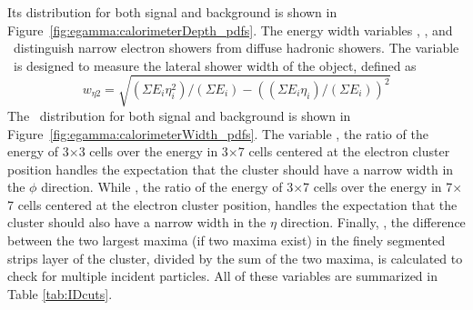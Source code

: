 Its distribution for both signal and background is shown in Figure~\ref{fig:egamma:calorimeterDepth_pdfs}.
The energy width variables \weta, \rphi, and \reta\ distinguish narrow electron showers from diffuse hadronic showers.
The variable \weta\ is designed to measure the lateral shower width of the object, defined as \begin{equation*}
    w_{\eta 2} = \sqrt{(\Sigma E_i \eta_i^2)/(\Sigma E_i) -((\Sigma E_i\eta_i)/(\Sigma E_i))^2}
\end{equation*}
The \weta\ distribution for both signal and background is shown in Figure~\ref{fig:egamma:calorimeterWidth_pdfs}.
The variable \Rphi, the ratio of the energy of 3$\times$3 cells over the energy in 3$\times$7 cells centered at the electron cluster position handles the expectation that the cluster should have a narrow width in the $\phi$ direction.
While \reta, the ratio of the energy of 3$\times$7 cells over the energy in 7$\times$7 cells centered at the electron cluster position, handles the expectation that the cluster should also have a narrow width in the $\eta$ direction.
Finally, \deltaEmax, the difference between the two largest maxima (if two maxima exist) in the finely segmented strips layer of the cluster, divided
by the sum of the two maxima, is calculated to check for multiple incident particles.
All of these variables are summarized in Table \ref{tab:IDcuts}.

